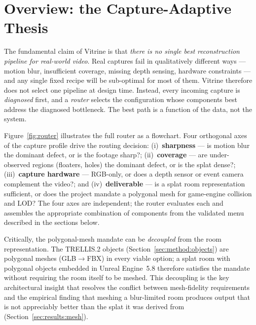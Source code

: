 %

\section{Overview: the Capture-Adaptive Thesis}
\label{sec:method:overview}

The fundamental claim of Vitrine is that \emph{there is no single best reconstruction
pipeline for real-world video}.  Real captures fail in qualitatively different ways ---
motion blur, insufficient coverage, missing depth sensing, hardware constraints --- and
any single fixed recipe will be sub-optimal for most of them.  Vitrine therefore does not
select one pipeline at design time.  Instead, every incoming capture is \emph{diagnosed}
first, and a \emph{router} selects the configuration whose components best address the
diagnosed bottleneck.  The best path is a function of the data, not the system.

Figure~\ref{fig:router} illustrates the full router as a flowchart.  Four orthogonal
axes of the capture profile drive the routing decision: (i)~\textbf{sharpness} --- is
motion blur the dominant defect, or is the footage sharp?; (ii)~\textbf{coverage} ---
are under-observed regions (floaters, holes) the dominant defect, or is the splat dense?;
(iii)~\textbf{capture hardware} --- RGB-only, or does a depth sensor or event camera
complement the video?; and (iv)~\textbf{deliverable} --- is a splat room representation
sufficient, or does the project mandate a polygonal mesh for game-engine collision and
LOD?  The four axes are independent; the router evaluates each and assembles the
appropriate combination of components from the validated menu described in the sections
below.

Critically, the polygonal-mesh mandate can be \emph{decoupled} from the room
representation.  The TRELLIS.2 objects (Section~\ref{sec:method:objects}) are polygonal
meshes (GLB$\rightarrow$FBX) in every viable option; a splat room with polygonal objects
embedded in Unreal Engine~5.8 therefore satisfies the mandate without requiring the room
itself to be meshed.  This decoupling is the key architectural insight that resolves the
conflict between mesh-fidelity requirements and the empirical finding that meshing a
blur-limited room produces output that is not appreciably better than the splat it was
derived from (Section~\ref{sec:results:mesh}).


